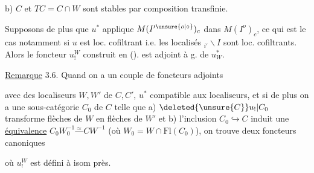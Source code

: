 
b) $C$ et $TC=C\cap W$ sont stables par composition
transfinie.

Supposons de plus que $u^*$ applique $M(I'^{\unsure{o|\circ}})_c$
dans $M(I^o)_c$, ce qui est le cas notamment
si $u$ est loc.  cofiltrant i.e. les
 localisés $\mathord{}_{i'}\backslash I$ sont loc. cofiltrants. 
Alors le foncteur $u_!^W$ construit en ().
est adjoint à g. de $u_W^*$.

\uline{Remarque} 3.6. Quand on a un couple
de foncteurs adjoints


avec des localiseurs $W,W'$ de $C,C'$,
$u^*$ compatible aux localiseurs, et si de
plus on a une sous-catégorie  $C_0$ de $C$
telle que a) $\deleted{\unsure{C}}u_!|C_0$ transforme flèches
de $W$ en flèches de $W'$ et b) l'inclusion
$C_0\hookrightarrow C$ induit une \uline{équivalence}
$C_0W_0^{-1}\overset{\approx}{\text{---}}CW^{-1}$ (où $W_0=W\cap\mathrm{Fl}(C_0)$),
on trouve deux foncteurs canoniques


où $u_!^W$ est défini  à isom  près.
